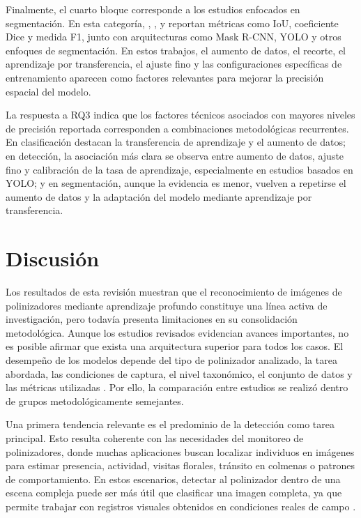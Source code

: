 Finalmente, el cuarto bloque corresponde a los estudios enfocados en segmentación. En esta categoría, \textcite{nizam2020segmentation}, \textcite{kongsilp2024individual}, \textcite{rodrigues2022deepwings} y \textcite{sledevic2025visual} reportan métricas como IoU, coeficiente Dice y medida F1, junto con arquitecturas como Mask R-CNN, YOLO y otros enfoques de segmentación. En estos trabajos, el aumento de datos, el recorte, el aprendizaje por transferencia, el ajuste fino y las configuraciones específicas de entrenamiento aparecen como factores relevantes para mejorar la precisión espacial del modelo.


La respuesta a RQ3 indica que los factores técnicos asociados con mayores niveles de precisión reportada corresponden a combinaciones metodológicas recurrentes. En clasificación destacan la transferencia de aprendizaje y el aumento de datos; en detección, la asociación más clara se observa entre aumento de datos, ajuste fino y calibración de la tasa de aprendizaje, especialmente en estudios basados en YOLO; y en segmentación, aunque la evidencia es menor, vuelven a repetirse el aumento de datos y la adaptación del modelo mediante aprendizaje por transferencia.



\section{Discusión}

Los resultados de esta revisión muestran que el reconocimiento de imágenes de polinizadores mediante aprendizaje profundo constituye una línea activa de investigación, pero todavía presenta limitaciones en su consolidación metodológica. Aunque los estudios revisados evidencian avances importantes, no es posible afirmar que exista una arquitectura superior para todos los casos. El desempeño de los modelos depende del tipo de polinizador analizado, la tarea abordada, las condiciones de captura, el nivel taxonómico, el conjunto de datos y las métricas utilizadas \parencite{ratnayake2021agriculture, khanzhina2022combating, hoye2021entomology}. Por ello, la comparación entre estudios se realizó dentro de grupos metodológicamente semejantes.

Una primera tendencia relevante es el predominio de la detección como tarea principal. Esto resulta coherente con las necesidades del monitoreo de polinizadores, donde muchas aplicaciones buscan localizar individuos en imágenes para estimar presencia, actividad, visitas florales, tránsito en colmenas o patrones de comportamiento. En estos escenarios, detectar al polinizador dentro de una escena compleja puede ser más útil que clasificar una imagen completa, ya que permite trabajar con registros visuales obtenidos en condiciones reales de campo \parencite{bjerge2022tracking, bjerge2023accurate, stark2023yolo, alex2025pollinator}.

